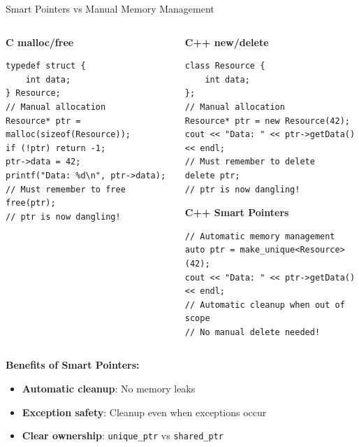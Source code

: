 \begin{frame}[fragile]{Smart Pointers vs Manual Memory Management}
	\begin{columns}
		\begin{column}{0.5\textwidth}
			\textbf{C malloc/free}
			\begin{verbatim}
typedef struct {
    int data;
} Resource;
// Manual allocation
Resource* ptr = malloc(sizeof(Resource));
if (!ptr) return -1;
ptr->data = 42;
printf("Data: %d\n", ptr->data);
// Must remember to free
free(ptr);
// ptr is now dangling!
			\end{verbatim}
		\end{column}
		\begin{column}{0.5\textwidth}
			\textbf{C++ new/delete}
			\begin{verbatim}
class Resource {
    int data;
};
// Manual allocation
Resource* ptr = new Resource(42);
cout << "Data: " << ptr->getData() << endl;
// Must remember to delete
delete ptr;
// ptr is now dangling!
			\end{verbatim}
			\textbf{C++ Smart Pointers}
			\begin{verbatim}
// Automatic memory management
auto ptr = make_unique<Resource>(42);
cout << "Data: " << ptr->getData() << endl;
// Automatic cleanup when out of scope
// No manual delete needed!
			\end{verbatim}
		\end{column}
	\end{columns}

	\vspace{0.5em}
	\textbf{Benefits of Smart Pointers:}
	\begin{itemize}
		\item \textbf{Automatic cleanup}: No memory leaks
		\item \textbf{Exception safety}: Cleanup even when exceptions occur
		\item \textbf{Clear ownership}: \texttt{unique\_ptr} vs \texttt{shared\_ptr}
	\end{itemize}
\end{frame}

